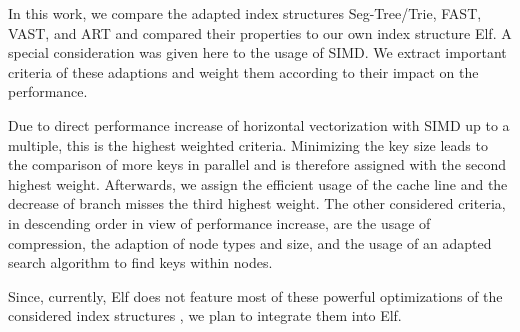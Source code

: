 \documentclass[runningheads,a4paper]{llncs}
\begin{document}

In this work, we compare the adapted index structures Seg-Tree/Trie, FAST, VAST, and ART and compared their properties to our own index structure Elf. A special consideration was given here to the usage of SIMD. We extract important criteria of these adaptions and weight them according to their impact on the performance.

Due to direct performance increase of horizontal vectorization with SIMD up to a multiple, this is the highest weighted criteria. Minimizing the key size leads to the comparison of more keys in parallel and is therefore assigned with the second highest weight. Afterwards, we assign the efficient usage of the cache line and the decrease of branch misses the third highest weight. The other considered criteria, in descending order in view of performance increase, are the usage of compression, the adaption of node types and size, and the usage of an adapted search algorithm to find keys within nodes. 

%
Since, currently, Elf does not feature most of these powerful optimizations of the considered index structures%
, we plan to integrate them into Elf. %

\end{document}
